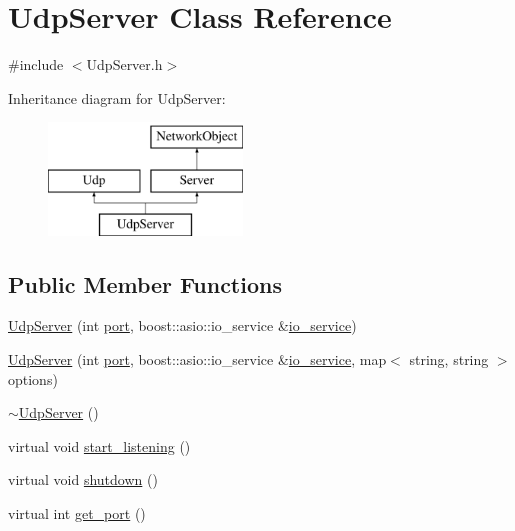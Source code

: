 \hypertarget{classUdpServer}{
\section{UdpServer Class Reference}
\label{classUdpServer}
}


{\ttfamily \#include $<$UdpServer.h$>$}

Inheritance diagram for UdpServer:\begin{figure}[H]
\begin{center}
\leavevmode
\includegraphics[height=3.000000cm]{classUdpServer}
\end{center}
\end{figure}
\subsection*{Public Member Functions}
\begin{DoxyCompactItemize}
\item 
\hyperlink{classUdpServer_afa92e10874c8a72188a3e1016aad97dc}{UdpServer} (int \hyperlink{classUdp_af69ea781b31a1fa62e5d3012b6288dc8}{port}, boost::asio::io\_\-service \&\hyperlink{classUdp_a7e143116ab3a0f478c8461ca04af782b}{io\_\-service})
\item 
\hyperlink{classUdpServer_ae8a101d8343c9906e42a3fa4bf25e7eb}{UdpServer} (int \hyperlink{classUdp_af69ea781b31a1fa62e5d3012b6288dc8}{port}, boost::asio::io\_\-service \&\hyperlink{classUdp_a7e143116ab3a0f478c8461ca04af782b}{io\_\-service}, map$<$ string, string $>$ options)
\item 
\hyperlink{classUdpServer_aef1871384fbc46ef425242be4474af3a}{$\sim$UdpServer} ()
\item 
virtual void \hyperlink{classUdpServer_a55e557d344720286fdeb430ae3cb3842}{start\_\-listening} ()
\item 
virtual void \hyperlink{classUdpServer_ac5623ca24bc56b21d608426f5bc8ad91}{shutdown} ()
\item 
virtual int \hyperlink{classUdpServer_a276c64a7545b49b298ca3d9ca1a12e9d}{get\_\-port} ()
\end{DoxyCompactItemize}
